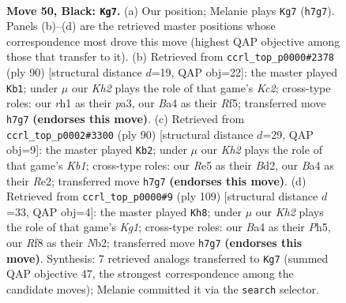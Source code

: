 \documentclass[11pt]{article}
\begin{document}
\clearpage

\begin{figure}[p]\centering
\begin{subfigure}{0.46\textwidth}\centering
\resizebox{\linewidth}{!}{%
\newchessgame
\chessboard[
  setfen={5r2/7k/1p6/p1p1r3/b7/2P2pPN/K2N3P/7R b - - 7 50},
  showmover=false,
  pgfstyle=straightmove, color=movearrow, markmove={h7-g7}
]}
\caption{}
\end{subfigure}\hfill
\begin{subfigure}{0.46\textwidth}\centering
\resizebox{\linewidth}{!}{%
\newchessgame
\chessboard[
  setfen={r7/1p4k1/2p5/2P2R1B/3PnP2/p3P2p/2K4P/8 w - - 1 46},
  showmover=false,
  pgfstyle=straightmove, color=movearrow, markmove={c2-b1}
]}
\caption{}
\end{subfigure}
\\[4pt]
\begin{subfigure}{0.46\textwidth}\centering
\resizebox{\linewidth}{!}{%
\newchessgame
\chessboard[
  setfen={r7/8/2p2kp1/1p1n3p/8/1P5P/P2BR1P1/1K6 w - - 0 46},
  showmover=false,
  pgfstyle=straightmove, color=movearrow, markmove={b1-b2}
]}
\caption{}
\end{subfigure}\hfill
\begin{subfigure}{0.46\textwidth}\centering
\resizebox{\linewidth}{!}{%
\newchessgame
\chessboard[
  setfen={6k1/R7/5p1N/p2r2pp/8/P6P/1n4PK/8 b - - 3 55},
  showmover=false,
  pgfstyle=straightmove, color=movearrow, markmove={g8-h8}
]}
\caption{}
\end{subfigure}
\caption{\textbf{Move 50, Black: \texttt{Kg7}.} (a) Our position; Melanie plays \texttt{Kg7} (\texttt{h7g7}). Panels (b)--(d) are the retrieved master positions whose correspondence most drove this move (highest QAP objective among those that transfer to it). (b) Retrieved from \texttt{ccrl\_top\_p0000\#2378} (ply 90) [structural distance $d$=19, QAP obj=22]: the master played \texttt{Kb1}; under $\mu$ our \emph{Kh2} plays the role of that game's \emph{Kc2}; cross-type roles: our \emph{r}h1 as their \emph{p}a3, our \emph{B}a4 as their \emph{R}f5; transferred move \texttt{h7g7} \textbf{(endorses this move)}. (c) Retrieved from \texttt{ccrl\_top\_p0002\#3300} (ply 90) [structural distance $d$=29, QAP obj=9]: the master played \texttt{Kb2}; under $\mu$ our \emph{Kh2} plays the role of that game's \emph{Kb1}; cross-type roles: our \emph{R}e5 as their \emph{B}d2, our \emph{B}a4 as their \emph{R}e2; transferred move \texttt{h7g7} \textbf{(endorses this move)}. (d) Retrieved from \texttt{ccrl\_top\_p0000\#9} (ply 109) [structural distance $d$=33, QAP obj=4]: the master played \texttt{Kh8}; under $\mu$ our \emph{Kh2} plays the role of that game's \emph{Kg1}; cross-type roles: our \emph{B}a4 as their \emph{P}h5, our \emph{R}f8 as their \emph{N}b2; transferred move \texttt{h7g7} \textbf{(endorses this move)}. Synthesis: 7 retrieved analogs transferred to \texttt{Kg7} (summed QAP objective 47, the strongest correspondence among the candidate moves); Melanie committed it via the \texttt{search} selector.}
\label{fig:thought-m99}
\end{figure}
\end{document}
